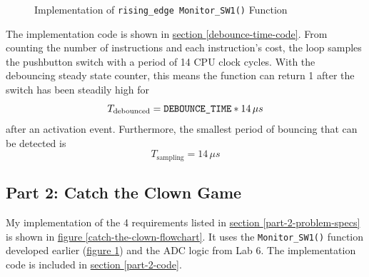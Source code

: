 \documentclass[11pt]{article}
\begin{document}
\begin{figure}[h!]
	\caption{Implementation of \texttt{rising\_edge Monitor\_SW1()} Function}
	\label{monitor-sw1-function-implementation}
\end{figure}

The implementation code is shown in
\hyperref[debounce-time-code]{section \ref{debounce-time-code}}.
From counting the number of instructions and each instruction's cost,
the loop samples the pushbutton switch with a period of 14 CPU clock cycles.
With the debouncing steady state counter, this means the function can return 1
after the switch has been steadily high for
\begin{equation}
T_{\textrm{debounced}}=\textrm{\texttt{DEBOUNCE\_TIME}}*14\,\mu s
\label{debounce-period-eq}
\end{equation}
after an activation event. Furthermore, the smallest period of bouncing
that can be detected is
\begin{equation}
T_{\textrm{sampling}}=14\,\mu s
\end{equation}


\subsection{Part 2: Catch the Clown Game}

My implementation of the 4 requirements listed in
\hyperref[part-2-problem-specs]{section \ref{part-2-problem-specs}}
is shown in
\hyperref[catch-the-clown-flowchart]{figure \ref{catch-the-clown-flowchart}}.
It uses the \texttt{Monitor\_SW1()} function developed earlier
(\hyperref[monitor-sw1-function-implementation]{figure \ref{monitor-sw1-function-implementation}})
and the ADC logic from Lab 6. The implementation code is included in
\hyperref[part-2-code]{section \ref{part-2-code}}.
\end{document}
